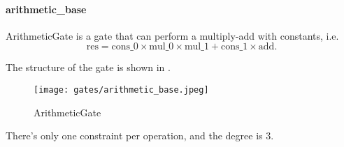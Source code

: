 \paragraph{arithmetic\_base}

\hspace*{\fill}

\indent ArithmeticGate is a gate that can perform a multiply-add with constants, i.e.
\[ \text{res} = \text{cons\_0} \times \text{mul\_0} \times \text{mul\_1} + \text{cons\_1} \times \text{add}. \]

The structure of the gate is shown in .

\begin{figure}[!ht]
    \centering
    \texttt{[image: gates/arithmetic\_base.jpeg]}
    \caption{ArithmeticGate}
    \label{fig:arithmetic-gate}
\end{figure}

There's only one constraint per operation, and the degree is 3.
